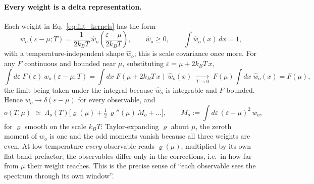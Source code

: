 \documentclass[10pt,a4paper]{article}
\theoremstyle{plain}
\theoremstyle{remark}
\begin{document}
\paragraph{Every weight is a delta representation.} Each weight in
Eq.~\eqref{eq:filt_kernels} has the form
\[
  w_o(\varepsilon-\mu;T) = \frac{1}{2k_BT}\,\hat w_o\left(\frac{\varepsilon-\mu}{2k_BT}\right),
  \qquad \hat w_o \geq 0, \qquad \int\hat w_o(x)\,dx = 1 ,
\]
with a temperature-independent shape $ \hat w_o $; this is scale covariance once
more. For any $ F $ continuous and bounded near $ \mu $, substituting
$ \varepsilon = \mu + 2k_BT\,x $,
\[
  \int d\varepsilon\;F(\varepsilon)\,w_o(\varepsilon-\mu;T)
  = \int dx\;F(\mu + 2k_BT\,x)\,\hat w_o(x)
  \;\xrightarrow[T\to0]{}\; F(\mu)\int dx\;\hat w_o(x) = F(\mu) ,
\]
the limit being taken under the integral because $ \hat w_o $ is integrable and
$ F $ bounded. Hence $ w_o \to \delta(\varepsilon - \mu) $ for every observable, and
\begin{equation}\label{eq:filt_delta_limit}
o(T,\mu)\;\simeq\;\Lambda_o(T)\Big[\varrho(\mu)+\tfrac12\,\varrho''(\mu)\,M_o+\dots\Big],
\qquad
M_o:=\int d\varepsilon\,(\varepsilon-\mu)^{2}\,w_o ,
\end{equation}
for $ \varrho $ smooth on the scale $ k_BT $: Taylor-expanding $ \varrho $ about $ \mu $,
the zeroth moment of $ w_o $ is one and the odd moments vanish because all three
weights are even. At low temperature \emph{every} observable reads $ \varrho(\mu) $,
multiplied by its own flat-band prefactor; the observables differ only in the
corrections, i.e.\ in how far from $ \mu $ their weight reaches. This is the
precise sense of ``each observable sees the spectrum through its own window''.
\end{document}
